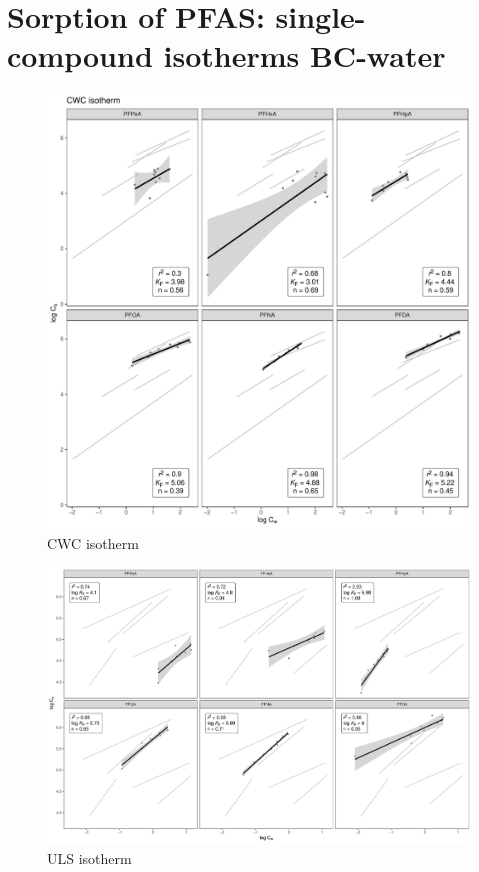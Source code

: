 \section{Sorption of PFAS: single-compound isotherms BC-water}

\begin{figure}
    \centering
    \includegraphics[width=\textwidth]{R/figs/CWC_facet_isotherm.pdf}
    \caption{CWC isotherm}
    \label{fig:CWC_isotherm}
\end{figure}

\begin{figure}
    \centering
    \includegraphics[width=\textwidth]{R/figs/ULS_facet_isotherm.pdf}
    \caption{ULS isotherm}
    \label{fig:ULS_isotherm}
\end{figure}

